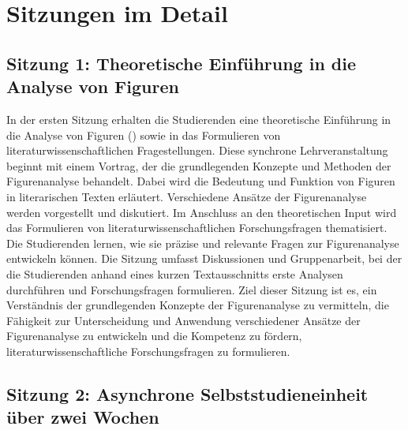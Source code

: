 \documentclass[
          a4paper,
        ]{article}
\begin{document}
\section{Sitzungen im Detail}\label{sitzungen-im-detail}

\subsection{Sitzung 1: Theoretische Einführung in die Analyse von
Figuren}\label{sitzung-1-theoretische-einfuxfchrung-in-die-analyse-von-figuren}

In der ersten Sitzung erhalten die Studierenden eine theoretische
Einführung in die Analyse von Figuren
() sowie in das
Formulieren von literaturwissenschaftlichen Fragestellungen. Diese
synchrone Lehrveranstaltung beginnt mit einem Vortrag, der die
grundlegenden Konzepte und Methoden der Figurenanalyse behandelt. Dabei
wird die Bedeutung und Funktion von Figuren in literarischen Texten
erläutert. Verschiedene Ansätze der Figurenanalyse werden vorgestellt
und diskutiert. Im Anschluss an den theoretischen Input wird das
Formulieren von literaturwissenschaftlichen Forschungsfragen
thematisiert. Die Studierenden lernen, wie sie präzise und relevante
Fragen zur Figurenanalyse entwickeln können. Die Sitzung umfasst
Diskussionen und Gruppenarbeit, bei der die Studierenden anhand eines
kurzen Textausschnitts erste Analysen durchführen und Forschungsfragen
formulieren. Ziel dieser Sitzung ist es, ein Verständnis der
grundlegenden Konzepte der Figurenanalyse zu vermitteln, die Fähigkeit
zur Unterscheidung und Anwendung verschiedener Ansätze der
Figurenanalyse zu entwickeln und die Kompetenz zu fördern,
literaturwissenschaftliche Forschungsfragen zu formulieren.

\subsection{Sitzung 2: Asynchrone Selbststudieneinheit über zwei
Wochen}\label{sitzung-2-asynchrone-selbststudieneinheit-uxfcber-zwei-wochen}
\end{document}
